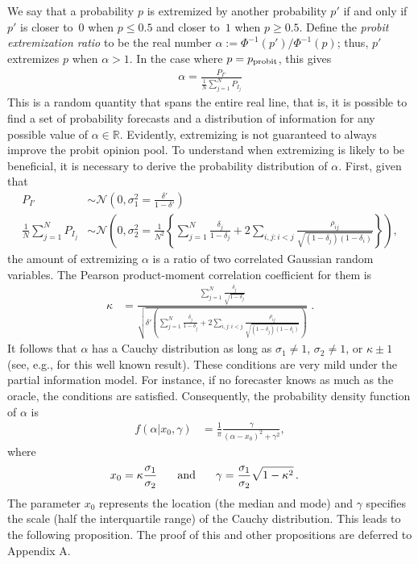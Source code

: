 \documentclass[11pt]{article}
\theoremstyle{definition}
\theoremstyle{definition}
\def\probit{p_{\rm probit}}
\begin{document}
We say that a probability $p$ is extremized by another probability $p'$ 
if and only if $p'$ is closer to~$0$ when $p \leq 0.5$ and closer 
to~$1$ when $p \geq 0.5$.  Define the {\em probit extremization ratio}
to be the real number $\alpha := \Phi^{-1}(p') / \Phi^{-1} (p)$; thus,
$p'$ extremizes $p$ when $\alpha > 1$.  In the case where $p = \probit$,
this gives
\begin{align}
\alpha  = \frac{P_{I'}}{\frac{1}{N}\sum_{j=1}^N P_{I_j}}\label{alpha}
\end{align}
%
This is a random quantity that spans the entire real line, that is, 
it is possible to find a set of probability forecasts and a distribution 
of information for any possible value of $\alpha \in \mathbb{R}$. 
Evidently, extremizing is not guaranteed to always improve the 
probit opinion pool.  
To understand when extremizing is likely to be beneficial, 
it is necessary to derive the probability distribution of $\alpha$. 
First, given that 
\begin{align*}
P_{I'} &\sim \mathcal{N}\left(0, \sigma^2_{1} = 
  \frac{\delta'}{1-\delta'} \right)\\ \frac{1}{N}\sum_{j=1}^N P_{I_j} 
&\sim \mathcal{N}\left(0, \sigma^2_{2} =\frac{1}{N^2} 
  \left\{ \sum_{j=1}^N \frac{\delta_j}{1-\delta_j} 
  + 2 \sum_{i,j: i<j} \frac{\rho_{ij}}{\sqrt{(1-\delta_j)(1-\delta_i)}}
  \right\} \right),
\end{align*}
the amount of extremizing $\alpha$ is a ratio of two correlated 
Gaussian random variables.  The Pearson product-moment correlation 
coefficient for them is
\begin{align*}
\kappa  &= 
  \frac{ \sum_{j=1}^N \frac{\delta_j}{\sqrt{1-\delta_j}}}
  {\sqrt{\delta'  \left( \sum_{j=1}^N \frac{\delta_j}{1-\delta_j} + 2 
  \sum_{i,j: i<j} \frac{\rho_{ij}}{\sqrt{(1-\delta_j)(1-\delta_i)}}\right)}}
  \; .
\end{align*}
It follows that $\alpha$ has a Cauchy distribution as long as 
$\sigma_1 \neq 1$, $\sigma_2 \neq 1$, or $\kappa \pm 1$ 
(see, e.g., \citealt{cedilnik2004distribution} for this 
well known result).  These conditions are very mild under 
the partial information model.  For instance, if no forecaster 
knows as much as the oracle, the conditions are satisfied. 
Consequently, the probability density function of $\alpha$ is
\begin{align*}
f(\alpha | x_0, \gamma) &= \frac{1}{\pi} 
  \frac{\gamma}{(\alpha-x_0)^2+\gamma^2}, 
\end{align*}
where 
\begin{align*}
x_0 = \kappa \frac{\sigma_1}{\sigma_2} \hspace{0.2in} \mbox{ and } 
  \hspace{0.2in} \gamma &= \frac{\sigma_1}{\sigma_2} \sqrt{1-\kappa^2} \, .
\end{align*}
The parameter $x_0$ represents the location (the median and mode) and 
$\gamma$ specifies the scale (half the interquartile range) of the 
Cauchy distribution. This leads to the following proposition. 
The proof of this and other propositions are deferred to Appendix A.
\end{document}

